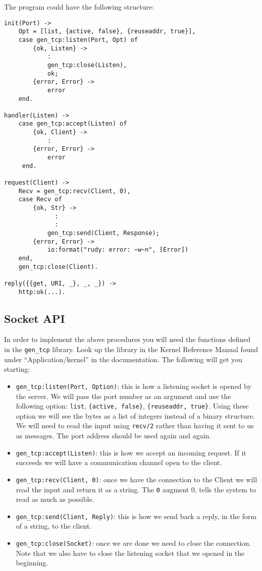 \documentclass[a4paper,11pt]{article}
\begin{document}
The program could have the following structure:

\begin{verbatim}
init(Port) ->
    Opt = [list, {active, false}, {reuseaddr, true}],
    case gen_tcp:listen(Port, Opt) of
        {ok, Listen} -> 
            :
            gen_tcp:close(Listen),
            ok;
        {error, Error} -> 
            error
    end.

handler(Listen) ->
    case gen_tcp:accept(Listen) of
        {ok, Client} ->
            :
        {error, Error} ->
            error
     end.

request(Client) ->
    Recv = gen_tcp:recv(Client, 0),
    case Recv of
        {ok, Str} ->
              :
              :
            gen_tcp:send(Client, Response);
        {error, Error} ->
            io:format("rudy: error: ~w~n", [Error])
    end,
    gen_tcp:close(Client).
    
reply({{get, URI, _}, _, _}) ->    
    http:ok(...).
\end{verbatim}


\subsection{Socket API}

In order to implement the above procedures you will need the functions
defined in the {\tt gen\_tcp} library. Look up the library in the
Kernel Reference Manual found under ``Application/kernel'' in the
documentation. The following will get you starting:

\begin{itemize} 

\item {\tt gen\_tcp:listen(Port, Option)}: this is how a listening
socket is opened by the server. We will pass the port number as an
argument and use the following option: {\tt list}, {\tt \{active,
false\}}, {\tt \{reuseaddr, true\}}. Using these option we will see the
bytes as a list of integers instead of a binary structure. We will
need to read the input using {\tt recv/2} rather than having it sent
to us as messages. The port address should be used again and again. 

\item {\tt gen\_tcp:accept(Listen)}: this is how we accept an incoming
request. If it succeeds we will have a communication channel open to
the client.

\item {\tt gen\_tcp:recv(Client, 0)}: once we have the connection to the
Client we will read the input and return it as a string. The {\tt 0}
augment 0, tells the system to read as much as possible.

\item {\tt gen\_tcp:send(Client, Reply)}: this is how we send back a reply,
in the form of a string, to the client.

\item {\tt gen\_tcp:close(Socket)}: once we are done we need to close the
connection. Note that we also have to close the listening socket that
we opened in the beginning.
\end{itemize}
\end{document}
